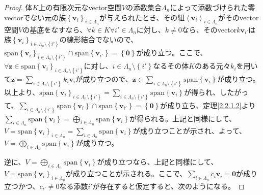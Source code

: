 \documentclass[dvipdfmx]{jsarticle}
\begin{document}
\begin{proof}
体$K$上の有限次元なvector空間$V$の添数集合$\varLambda_{n}$によって添数づけられた零vectorでない元の族$\left\{ \mathbf{v}_{i} \right\}_{i \in \varLambda_{n}}$が与えられたとき、その組$\left\langle \mathbf{v}_{i} \right\rangle_{i \in \varLambda_{n}}$がそのvector空間$V$の基底をなすなら、$\forall k \in K\forall i' \in \varLambda_{n}$に対し、$k \neq 0$なら、そのvector$k\mathbf{v}_{i'}$は族$\left\{ \mathbf{v}_i \right\}_{i \in \varLambda_{n} \setminus \left\{ i' \right\} } $の線形結合でないので、${\mathrm{span} }\left\{ \mathbf{v}_{i} \right\}_{i \in \varLambda_{n} \setminus \left\{ i' \right\}} \cap {\mathrm{span} }\left\{ \mathbf{v}_{i'} \right\} = \left\{ \mathbf{0} \right\}$が成り立つ。ここで、$\forall\mathbf{z} \in {\mathrm{span} }\left\{ \mathbf{v}_{i} \right\}_{i \in \varLambda_{n} \setminus \left\{ i' \right\}}$に対し、$i \in \varLambda_{n} \setminus \left\{ i' \right\}$なるその体$K$のある元々$k_{i}$を用いて$\mathbf{z} = \sum_{i \in \varLambda_{n} \setminus \left\{ i' \right\}} {k_{i}\mathbf{v}_{i}}$が成り立つので、$\mathbf{z} \in \sum_{i \in \varLambda_{n} \setminus \left\{ i' \right\}} {{\mathrm{span} }\left\{ \mathbf{v}_{i} \right\}}$が成り立つ。以上より、${\mathrm{span} }\left\{ \mathbf{v}_{i} \right\}_{i \in \varLambda_{n} \setminus \left\{ i' \right\}} = \sum_{i \in \varLambda_{n} \setminus \left\{ i' \right\}} {{\mathrm{span} }\left\{ \mathbf{v}_{i} \right\}}$が得られ、したがって、$\sum_{i \in \varLambda_{n} \setminus \left\{ i' \right\}} {{\mathrm{span} }\left\{ \mathbf{v}_{i} \right\}} \cap {\mathrm{span} }\left\{ \mathbf{v}_{i'} \right\} = \left\{ \mathbf{0} \right\}$が成り立ち、定理\ref{2.2.1.2}より$\sum_{i \in \varLambda_{n}} {{\mathrm{span} }\left\{ \mathbf{v}_{i} \right\}} = \bigoplus_{i \in \varLambda_{n}} {{\mathrm{span} }\left\{ \mathbf{v}_{i} \right\}}$が得られる。上記と同様にして、$V = {\mathrm{span} }\left\{ \mathbf{v}_{i} \right\}_{i \in \varLambda_{n}} = \sum_{i \in \varLambda_{n}} {{\mathrm{span} }\left\{ \mathbf{v}_{i} \right\}}$が成り立つことが示され、よって、$V = \bigoplus_{i \in \varLambda_{n}} {{\mathrm{span} }\left\{ \mathbf{v}_{i} \right\}}$が成り立つ。\par
逆に、$V = \bigoplus_{i \in \varLambda_{n}} {{\mathrm{span} }\left\{ \mathbf{v}_{i} \right\}}$が成り立つなら、上記と同様にして、$V = {\mathrm{span} }\left\{ \mathbf{v}_{i} \right\}_{i \in \varLambda_{n}}$が成り立つことが示される。ここで、$\sum_{i \in \varLambda_{n}} {c_{i}\mathbf{v}_{i}} = \mathbf{0}$が成り立つかつ、$c_{i'} \neq 0$なる添数$i'$が存在すると仮定すると、次のようになる。

\end{proof}
\end{document}
